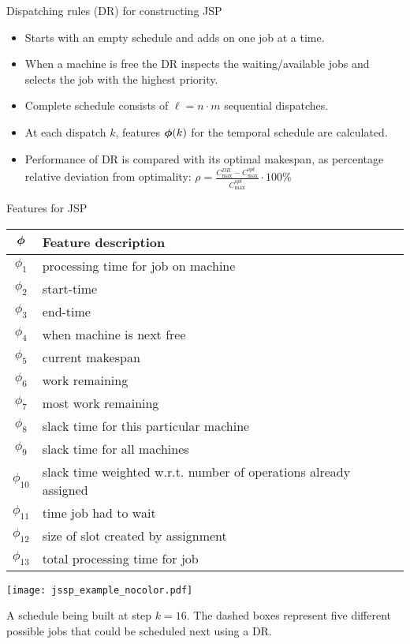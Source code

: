 \documentclass[xcolor=pdftex,t,11pt,handout]{beamer}
\begin{document}
{\framebreak
\begin{block}{Dispatching rules (DR) for constructing JSP}
\begin{itemize}
	\item Starts with an empty schedule and adds on one job at a time. 
	\item When a machine is free the DR inspects the waiting/available jobs and selects the job with the \alert{highest priority}. 
	\item Complete schedule consists of $\ell=n\cdot m$ sequential dispatches.
	\item At each dispatch $k$, \alert{features} ${\boldsymbol{\phi}}(k)$ for the temporal schedule are calculated.
	\item Performance of DR is compared with its optimal makespan, as percentage relative deviation from optimality: $\rho=\frac{C_{\max}^{DR}-C_{\max}^{opt}}{C_{\max}^{opt}}\cdot 100\%$
\end{itemize}
\end{block}
\framebreak
\begin{block}{Features for JSP}\label{tbl:features}
\begin{table}[t!]
 {\scriptsize
 \begin{center}
  \begin{tabular}{|c|l|}
   \hline\hline
  ${\boldsymbol{\phi}}$ & Feature description \\ \hline
  $\phi_1$ & processing time for job on machine\\
  $\phi_2$ & start-time \\
  $\phi_3$ & end-time \\
  $\phi_4$ & when machine is next free \\
  $\phi_5$ & current makespan \\
  $\phi_6$ & work remaining \\
  $\phi_7$ & most work remaining \\
  $\phi_8$ & slack time for this particular machine \\
  $\phi_9$ & slack time for all machines \\
  $\phi_{10}$ & slack time weighted w.r.t. number of operations already assigned \\
  $\phi_{11}$ & time job had to wait\\
  $\phi_{12}$ & size of slot created by assignment \\
  $\phi_{13}$ & total processing time for job \\
 \hline\hline
  \end{tabular}
 \end{center}}
\end{table}
\end{block}

\framebreak
\begin{example}
	\begin{center}
		\texttt{[image: jssp\_example\_nocolor.pdf]}
	\end{center}
	A schedule being built at step $k=16$. The dashed boxes represent five different possible jobs that could be scheduled next using a DR.
\end{example}
}
\end{document}
